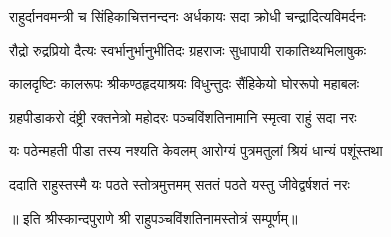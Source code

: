 

\twolineshloka
{राहुर्दानवमन्त्री च सिंहिकाचित्तनन्दनः}
{अर्धकायः सदा क्रोधी चन्द्रादित्यविमर्दनः}

\twolineshloka
{रौद्रो रुद्रप्रियो दैत्यः स्वर्भानुर्भानुभीतिदः}
{ग्रहराजः सुधापायी राकातिथ्यभिलाषुकः}

\twolineshloka
{कालदृष्टिः कालरूपः श्रीकण्ठहृदयाश्रयः}
{विधुन्तुदः सैंहिकेयो घोररूपो महाबलः}

\twolineshloka
{ग्रहपीडाकरो दंष्ट्री रक्तनेत्रो महोदरः}
{पञ्चविंशतिनामानि स्मृत्वा राहुं सदा नरः}

\twolineshloka
{यः पठेन्महती पीडा तस्य नश्यति केवलम्}
{आरोग्यं पुत्रमतुलां श्रियं धान्यं पशूंस्तथा}

\twolineshloka
{ददाति राहुस्तस्मै यः पठते स्तोत्रमुत्तमम्}
{सततं पठते यस्तु जीवेद्वर्षशतं नरः}

॥ इति श्रीस्कान्दपुराणे श्री राहुपञ्चविंशतिनामस्तोत्रं सम्पूर्णम्॥

